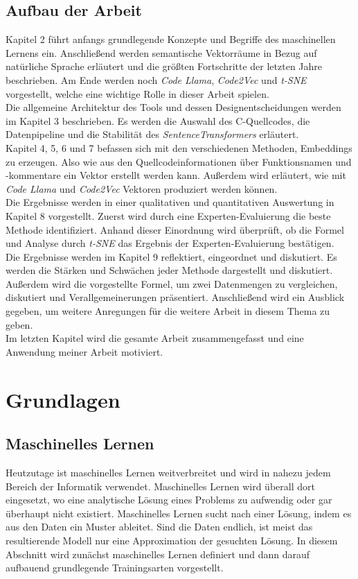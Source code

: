 \documentclass[12pt,letterpaper,ngerman]{article}
\begin{document}
\subsection{Aufbau der Arbeit}
Kapitel 2 führt anfangs grundlegende Konzepte und Begriffe des maschinellen 
Lernens ein. Anschließend werden semantische Vektorräume in Bezug auf 
natürliche Sprache erläutert und die größten Fortschritte der letzten Jahre 
beschrieben. Am Ende werden noch \textit{Code Llama},  \textit{Code2Vec}  und 
\textit{t-SNE} vorgestellt, welche eine wichtige Rolle in dieser Arbeit spielen.\\
Die allgemeine Architektur des Tools und dessen Designentscheidungen werden im Kapitel 3
beschrieben. Es werden die Auswahl des C-Quellcodes, die Datenpipeline und die 
Stabilität des \textit{SentenceTransformers} erläutert.\\
Kapitel 4, 5, 6 und 7 befassen sich mit den verschiedenen Methoden, Embeddings
zu erzeugen. Also wie aus den Quellcodeinformationen über Funktionsnamen und
-kommentare ein Vektor erstellt werden kann. Außerdem wird erläutert, wie mit
\textit{Code Llama} und  \textit{Code2Vec}  Vektoren produziert werden können.\\
Die Ergebnisse werden in einer qualitativen und quantitativen Auswertung in 
Kapitel 8 vorgestellt. Zuerst wird durch eine Experten-Evaluierung die beste
Methode identifiziert. Anhand dieser Einordnung wird überprüft, ob
die Formel und Analyse durch \textit{t-SNE} das Ergebnis der 
Experten-Evaluierung bestätigen.\\
Die Ergebnisse werden im Kapitel 9 reflektiert, eingeordnet und 
diskutiert. 
Es werden die Stärken und Schwächen jeder Methode dargestellt und
diskutiert.
Außerdem wird die vorgestellte Formel, um zwei Datenmengen zu 
vergleichen, diskutiert und Verallgemeinerungen präsentiert.
Anschließend wird ein Ausblick gegeben, um weitere Anregungen
für die weitere Arbeit in diesem Thema zu geben.\\
Im letzten Kapitel wird die gesamte Arbeit zusammengefasst und 
eine Anwendung meiner Arbeit motiviert.
\pagebreak
\section{Grundlagen}
\subsection{Maschinelles Lernen}
Heutzutage ist maschinelles Lernen weitverbreitet und wird in nahezu jedem
Bereich der Informatik verwendet.  Maschinelles Lernen wird überall dort 
eingesetzt, wo eine analytische Lösung eines Problems zu aufwendig oder gar 
überhaupt nicht existiert. Maschinelles Lernen sucht nach einer Lösung, indem 
es aus den Daten ein Muster ableitet. Sind die Daten endlich, ist meist das 
resultierende Modell nur eine Approximation der gesuchten Lösung. In diesem 
Abschnitt wird zunächst maschinelles Lernen definiert und dann darauf aufbauend 
grundlegende Trainingsarten vorgestellt.
\end{document}
